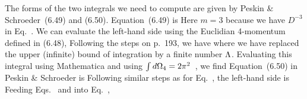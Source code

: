 \documentclass[11pt]{article}
\begin{document}
{	The forms of the two integrals we need to compute are given by Peskin \& Schroeder~(6.49) and (6.50).  Equation~(6.49) is
	Here $m = 3$ because we have $D^{-3}$ in Eq.~.  We can evaluate the left-hand side using the Euclidian 4-momentum defined in (6.48),
	Following the steps on p.~193, we have
	where we have replaced the upper (infinite) bound of integration by a finite number $\Lambda$.  Evaluating this integral using Mathematica and using $\int \dd{\Omega_4} = 2 \pi^2$~\cite[p.~193]{Peskin}, we find
	Equation~(6.50) in Peskin \& Schroeder is
	Following similar steps as for Eq.~, the left-hand side is
	Feeding Eqs.~ and  into Eq.~,
}
\end{document}
